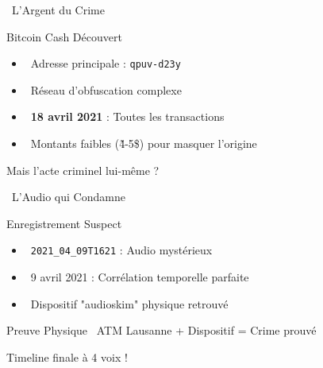 \documentclass{beamer}
\begin{document}
\begin{frame}{\faDollar \, L'Argent du Crime}
\begin{block}{Bitcoin Cash Découvert}
\begin{itemize}
    \item \faBitcoin \, Adresse principale : \texttt{qpuv-d23y}
    \item \faRandom \, Réseau d'obfuscation complexe
    \item \faCalendar \, \textbf{18 avril 2021} : Toutes les transactions
    \item \faDollar \, Montants faibles (\~4-5\$) pour masquer l'origine
\end{itemize}
\end{block}

\begin{center}
\fbox{\begin{minipage}{6cm}
\centering
\textcolor{gray}{Schéma\\Réseau Bitcoin\\Obfuscation}
\end{minipage}}
\end{center}

\pause
\begin{center}
\Large{\textcolor{hydroblue}{Mais l'acte criminel lui-même ?}}
\end{center}
\end{frame}

\begin{frame}{\faVolumeUp \, L'Audio qui Condamne}
\begin{block}{Enregistrement Suspect}
\begin{itemize}
    \item \faVolumeUp \, \texttt{2021\_04\_09T1621} : Audio mystérieux
    \item \faCalendar \, 9 avril 2021 : Corrélation temporelle parfaite
    \item \faCreditCard \, Dispositif "audioskim" physique retrouvé
\end{itemize}
\end{block}

\begin{alertblock}{Preuve Physique}
\faMapMarker \, ATM Lausanne + Dispositif = Crime prouvé
\end{alertblock}

\pause
\begin{center}
\Large{\textcolor{crimsonred}{Timeline finale à 4 voix !}}
\end{center}
\end{frame}
\end{document}
